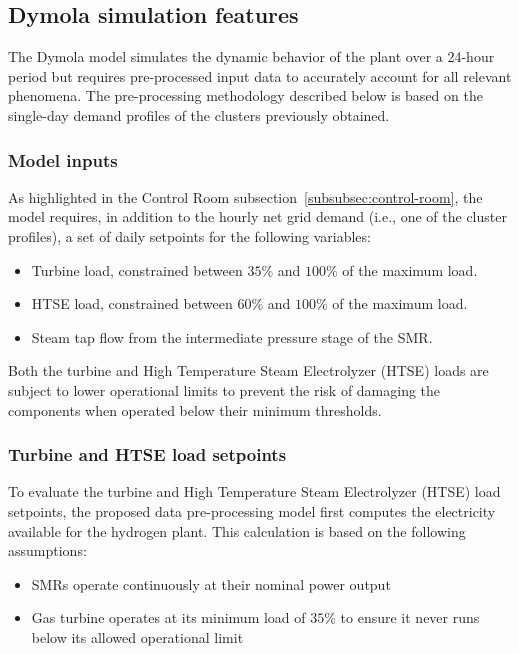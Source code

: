 \subsection{Dymola simulation features}
The Dymola model simulates the dynamic behavior of the plant over a 24-hour period but requires pre-processed input data to accurately account for all relevant phenomena. The pre-processing methodology described below is based on the single-day demand profiles of the clusters previously obtained.

\subsubsection{Model inputs}
As highlighted in the Control Room subsection~\ref{subsubsec:control-room}, the model requires, in addition to the hourly net grid demand (i.e., one of the cluster profiles), a set of daily setpoints for the following variables:

\begin{itemize}
  \item Turbine load, constrained between $35\%$ and $100\%$ of the maximum load.
  \item HTSE load, constrained between $60\%$ and $100\%$ of the maximum load.
  \item Steam tap flow from the intermediate pressure stage of the SMR.
\end{itemize}

Both the turbine and High Temperature Steam Electrolyzer (HTSE) loads are subject to lower operational limits to prevent the risk of damaging the components when operated below their minimum thresholds.

\subsubsection{Turbine and HTSE load setpoints}
To evaluate the turbine and High Temperature Steam Electrolyzer (HTSE) load setpoints, the proposed data pre-processing model first computes the electricity available for the hydrogen plant. This calculation is based on the following assumptions:
\begin{itemize}
  \item SMRs operate continuously at their nominal power output
  \item Gas turbine operates at its minimum load of $35\%$ to ensure it never runs below its allowed operational limit
\end{itemize}

